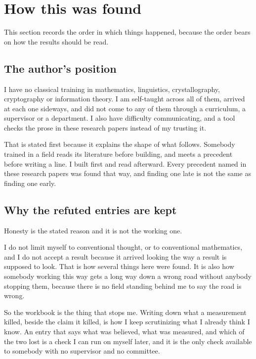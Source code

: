 \chapter*{How this was found}

This section records the order in which things happened, because the order bears on how the results
should be read.

\section*{The author's position}

I have no classical training in mathematics, linguistics, crystallography, cryptography or
information theory. I am self-taught across all of them, arrived at each one sideways, and did not
come to any of them through a curriculum, a supervisor or a department. I also have difficulty
communicating, and a tool checks the prose in these research papers instead of my trusting it.

That is stated first because it explains the shape of what follows. Somebody trained in a field
reads its literature before building, and meets a precedent before writing a line. I built first and
read afterward. Every precedent named in these research papers was found that way, and finding one late is not
the same as finding one early.

\section*{Why the refuted entries are kept}

Honesty is the stated reason and it is not the working one.

I do not limit myself to conventional thought, or to conventional mathematics, and I do not accept a
result because it arrived looking the way a result is supposed to look. That is how several things
here were found. It is also how somebody working this way gets a long way down a wrong road without
anybody stopping them, because there is no field standing behind me to say the road is wrong.

So the workbook is the thing that stops me. Writing down what a measurement killed, beside the claim
it killed, is how I keep scrutinizing what I already think I know. An entry that says what was
believed, what was measured, and which of the two lost is a check I can run on myself later, and it
is the only check available to somebody with no supervisor and no committee.

